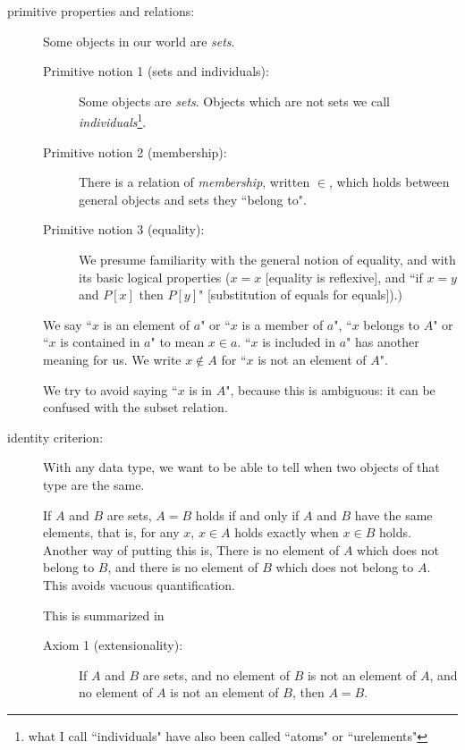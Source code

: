 \documentclass[12pt]{article}
\begin{document}
\begin{description}

\item[primitive properties and relations:]  Some objects in our world are {\em sets\/}.  

\begin{description}

\item[Primitive notion 1 (sets and individuals):]  Some objects are {\em sets\/}.  Objects which are not sets we call {\em individuals\/}\footnote{what I call ``individuals" have also been called ``atoms" or ``urelements"}.

\item[Primitive notion 2 (membership):]  There is a relation of {\em membership}, written $\in$, which holds between general objects and sets they ``belong to".

\item[Primitive notion 3 (equality):]  We presume familiarity with the general notion of equality, and with its basic logical properties ($x=x$ [equality is reflexive], and ``if $x=y$ and $P[x]$ then $P[y]$" [substitution of equals for equals]).)

\end{description} 

We say ``$x$ is an element of $a$" or ``$x$ is a member of $a$", ``$x$ belongs to $A$" or ``$x$ is contained in $a$" to mean $x \in a$.   ``$x$ is included in $a$" has another meaning for us.  We write $x \not\in A$ for ``$x$ is not an element of $A$".

We try to avoid saying ``$x$ is in $A$", because this is ambiguous: it can be confused with the subset relation.

\item[identity criterion:]  With any data type, we want to be able to tell when two objects of that type are the same.

If $A$ and $B$ are sets, $A=B$ holds if and only if $A$ and $B$ have the same elements, that is, for any $x$, $x \in A$ holds exactly when $x \in B$ holds.   Another way of putting this is, There is no element of $A$ which does not belong to $B$, and there is no element of $B$ which does not belong to $A$.  This avoids vacuous quantification.

This is summarized in

\begin{description}

\item[Axiom 1 (extensionality):]  If $A$ and $B$ are sets, and no element of $B$ is not an element of $A$, and no element of $A$ is not an element of $B$, then $A=B$.


\end{description}
\end{description}
\end{document}
